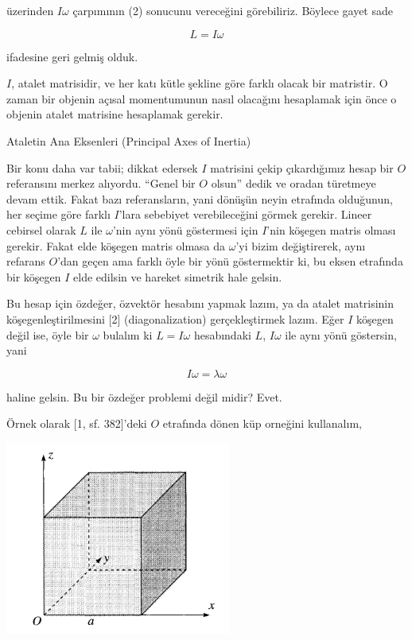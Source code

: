 \documentclass[12pt,fleqn]{article}\usepackage{../../common}
\begin{document}
üzerinden $I \omega$ çarpımının (2) sonucunu vereceğini görebiliriz. Böylece
gayet sade

$$
L = I \omega
$$

ifadesine geri gelmiş olduk.

$I$, atalet matrisidir, ve her katı kütle şekline göre farklı olacak bir
matristir. O zaman bir objenin açısal momentumunun nasıl olacağını hesaplamak
için önce o objenin atalet matrisine hesaplamak gerekir.

Ataletin Ana Eksenleri (Principal Axes of Inertia) 

Bir konu daha var tabii; dikkat edersek $I$ matrisini çekip çıkardığımız hesap
bir $O$ referansını merkez alıyordu. ``Genel bir $O$ olsun'' dedik ve oradan
türetmeye devam ettik. Fakat bazı referansların, yani dönüşün neyin etrafında
olduğunun, her seçime göre farklı $I$'lara sebebiyet verebileceğini görmek
gerekir. Lineer cebirsel olarak $L$ ile $\omega$'nin aynı yönü göstermesi için
$I$'nin köşegen matris olması gerekir. Fakat elde köşegen matris olmasa da
$\omega$'yi bizim değiştirerek, aynı refarans $O$'dan geçen ama farklı öyle bir
yönü göstermektir ki, bu eksen etrafında bir köşegen $I$ elde edilsin ve hareket
simetrik hale gelsin.

Bu hesap için özdeğer, özvektör hesabını yapmak lazım, ya da atalet matrisinin
köşegenleştirilmesini [2] (diagonalization) gerçekleştirmek lazım. Eğer $I$
köşegen değil ise, öyle bir $\omega$ bulalım ki $L = I \omega$ hesabındaki
$L$, $I \omega$ ile aynı yönü göstersin, yani

$$
I\omega = \lambda \omega
$$

haline gelsin. Bu bir özdeğer problemi değil midir? Evet. 

Örnek olarak [1, sf. 382]'deki $O$ etrafında dönen küp orneğini kullanalım,

\includegraphics[width=20em]{phy_005_basics_04_01.png}
\end{document}
